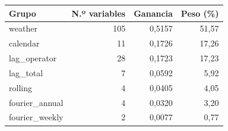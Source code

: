 \begin{tabular}{lrrr}
\toprule
\rowcolor{naranja}
\textbf{Grupo} & \textbf{N.º variables} & \textbf{Ganancia} & \textbf{Peso (\%)} \\
\midrule
\rowcolor{filaclara} weather & 105 & 0,5157 & 51,57 \\
calendar & 11 & 0,1726 & 17,26 \\
\rowcolor{filaclara} lag\_\allowbreak{}operator & 28 & 0,1723 & 17,23 \\
lag\_\allowbreak{}total & 7 & 0,0592 & 5,92 \\
\rowcolor{filaclara} rolling & 4 & 0,0405 & 4,05 \\
fourier\_\allowbreak{}annual & 4 & 0,0320 & 3,20 \\
\rowcolor{filaclara} fourier\_\allowbreak{}weekly & 2 & 0,0077 & 0,77 \\
\bottomrule
\end{tabular}
